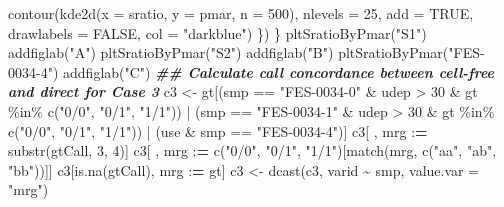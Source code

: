 \documentclass[11pt,letterpaper,oneside]{book}
\newenvironment{Shaded}{\begin{snugshade}}{\end{snugshade}}
\newcommand{\AttributeTok}[1]{\textcolor[rgb]{0.77,0.63,0.00}{#1}}
\newcommand{\ConstantTok}[1]{\textcolor[rgb]{0.00,0.00,0.00}{#1}}
\newcommand{\DecValTok}[1]{\textcolor[rgb]{0.00,0.00,0.81}{#1}}
\newcommand{\DocumentationTok}[1]{\textcolor[rgb]{0.56,0.35,0.01}{\textbf{\textit{#1}}}}
\newcommand{\ErrorTok}[1]{\textcolor[rgb]{0.64,0.00,0.00}{\textbf{#1}}}
\newcommand{\FunctionTok}[1]{\textcolor[rgb]{0.00,0.00,0.00}{#1}}
\newcommand{\NormalTok}[1]{#1}
\newcommand{\OtherTok}[1]{\textcolor[rgb]{0.56,0.35,0.01}{#1}}
\newcommand{\SpecialCharTok}[1]{\textcolor[rgb]{0.00,0.00,0.00}{#1}}
\newcommand{\StringTok}[1]{\textcolor[rgb]{0.31,0.60,0.02}{#1}}
\begin{document}
\begin{Shaded}
\begin{Highlighting}[]
    \FunctionTok{contour}\NormalTok{(}\FunctionTok{kde2d}\NormalTok{(}\AttributeTok{x =}\NormalTok{ sratio, }\AttributeTok{y =}\NormalTok{ pmar, }\AttributeTok{n =} \DecValTok{500}\NormalTok{),}
            \AttributeTok{nlevels =} \DecValTok{25}\NormalTok{,}
            \AttributeTok{add =} \ConstantTok{TRUE}\NormalTok{,}
            \AttributeTok{drawlabels =} \ConstantTok{FALSE}\NormalTok{,}
            \AttributeTok{col =} \StringTok{"darkblue"}\NormalTok{)}
\NormalTok{  \})}
\NormalTok{\}}
\FunctionTok{pltSratioByPmar}\NormalTok{(}\StringTok{"S1"}\NormalTok{)}
\FunctionTok{addfiglab}\NormalTok{(}\StringTok{"A"}\NormalTok{)}
\FunctionTok{pltSratioByPmar}\NormalTok{(}\StringTok{"S2"}\NormalTok{)}
\FunctionTok{addfiglab}\NormalTok{(}\StringTok{"B"}\NormalTok{)}
\FunctionTok{pltSratioByPmar}\NormalTok{(}\StringTok{"FES{-}0034{-}4"}\NormalTok{)}
\FunctionTok{addfiglab}\NormalTok{(}\StringTok{"C"}\NormalTok{)}
\DocumentationTok{\#\# Calculate call concordance between cell{-}free and direct for Case 3}
\NormalTok{c3 }\OtherTok{\textless{}{-}}\NormalTok{ gt[(smp }\SpecialCharTok{==} \StringTok{"FES{-}0034{-}0"} \SpecialCharTok{\&}\NormalTok{ udep }\SpecialCharTok{\textgreater{}} \DecValTok{30} \SpecialCharTok{\&}\NormalTok{ gt }\SpecialCharTok{\%in\%} \FunctionTok{c}\NormalTok{(}\StringTok{"0/0"}\NormalTok{, }\StringTok{"0/1"}\NormalTok{, }\StringTok{"1/1"}\NormalTok{)) }\SpecialCharTok{|}
\NormalTok{           (smp }\SpecialCharTok{==} \StringTok{"FES{-}0034{-}1"} \SpecialCharTok{\&}\NormalTok{ udep }\SpecialCharTok{\textgreater{}} \DecValTok{30} \SpecialCharTok{\&}\NormalTok{ gt }\SpecialCharTok{\%in\%} \FunctionTok{c}\NormalTok{(}\StringTok{"0/0"}\NormalTok{, }\StringTok{"0/1"}\NormalTok{, }\StringTok{"1/1"}\NormalTok{)) }\SpecialCharTok{|}
\NormalTok{           (use }\SpecialCharTok{\&}\NormalTok{ smp }\SpecialCharTok{==} \StringTok{"FES{-}0034{-}4"}\NormalTok{)]}
\NormalTok{c3[ , mrg }\SpecialCharTok{:}\ErrorTok{=} \FunctionTok{substr}\NormalTok{(gtCall, }\DecValTok{3}\NormalTok{, }\DecValTok{4}\NormalTok{)]}
\NormalTok{c3[ , mrg }\SpecialCharTok{:}\ErrorTok{=} \FunctionTok{c}\NormalTok{(}\StringTok{"0/0"}\NormalTok{, }\StringTok{"0/1"}\NormalTok{, }\StringTok{"1/1"}\NormalTok{)[}\FunctionTok{match}\NormalTok{(mrg, }\FunctionTok{c}\NormalTok{(}\StringTok{"aa"}\NormalTok{, }\StringTok{"ab"}\NormalTok{, }\StringTok{"bb"}\NormalTok{))]]}
\NormalTok{c3[}\FunctionTok{is.na}\NormalTok{(gtCall), mrg }\SpecialCharTok{:}\ErrorTok{=}\NormalTok{ gt]}
\NormalTok{c3 }\OtherTok{\textless{}{-}} \FunctionTok{dcast}\NormalTok{(c3, varid }\SpecialCharTok{\textasciitilde{}}\NormalTok{ smp, }\AttributeTok{value.var =} \StringTok{"mrg"}\NormalTok{)}

\end{Highlighting}
\end{Shaded}
\end{document}
